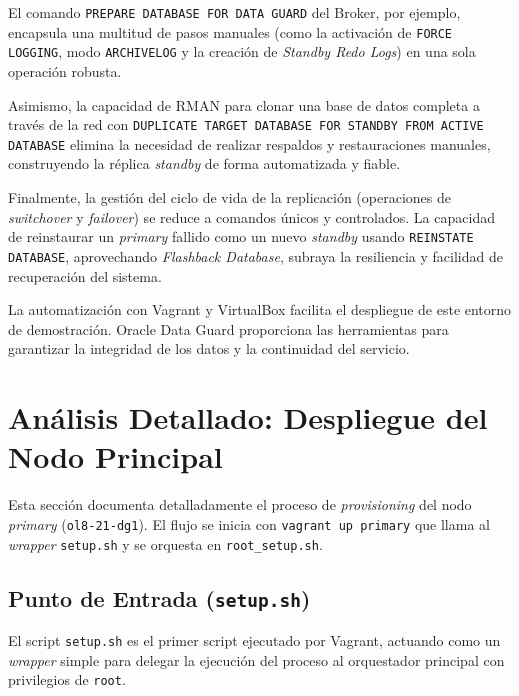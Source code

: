 \documentclass[11pt, a4paper]{report}
\begin{document}
El comando \texttt{PREPARE DATABASE FOR DATA GUARD} del Broker, por ejemplo, encapsula una multitud de pasos manuales (como la activación de \texttt{FORCE LOGGING}, modo \texttt{ARCHIVELOG} y la creación de \textit{Standby Redo Logs}) en una sola operación robusta.

Asimismo, la capacidad de RMAN para clonar una base de datos completa a través de la red con \texttt{DUPLICATE TARGET DATABASE FOR STANDBY FROM ACTIVE DATABASE} elimina la necesidad de realizar respaldos y restauraciones manuales, construyendo la réplica \textit{standby} de forma automatizada y fiable.

Finalmente, la gestión del ciclo de vida de la replicación (operaciones de \textit{switchover} y \textit{failover}) se reduce a comandos únicos y controlados. La capacidad de reinstaurar un \textit{primary} fallido como un nuevo \textit{standby} usando \texttt{REINSTATE DATABASE}, aprovechando \textit{Flashback Database}, subraya la resiliencia y facilidad de recuperación del sistema.

La automatización con Vagrant y VirtualBox facilita el despliegue de este entorno de demostración. Oracle Data Guard proporciona las herramientas para garantizar la integridad de los datos y la continuidad del servicio.


\newpage
\appendix


\chapter[Apéndice A: Despliegue Primary]{Análisis Detallado: Despliegue del Nodo Principal}

Esta sección documenta detalladamente el proceso de \textit{provisioning} del nodo \textit{primary} (\texttt{ol8-21-dg1}).
El flujo se inicia con \texttt{vagrant up primary} que llama al \textit{wrapper} \texttt{setup.sh} y se orquesta en \texttt{root\_setup.sh}.
\section{Punto de Entrada (\texttt{setup.sh})}

El script \texttt{setup.sh} es el primer script ejecutado por Vagrant, actuando como un \textit{wrapper} simple para delegar la ejecución del proceso al orquestador principal con privilegios de \texttt{root}.
\end{document}

